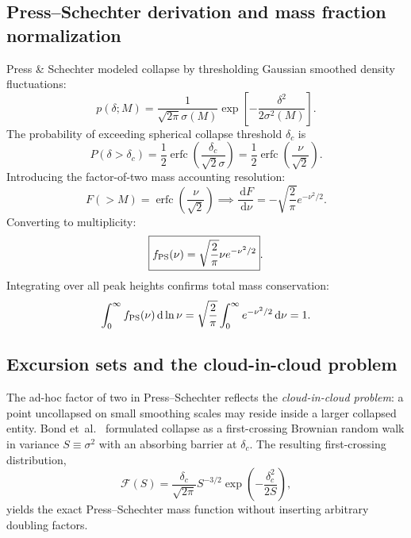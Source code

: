 \documentclass[11pt]{article}
\newcommand{\dd}{\,\mathrm d}
\begin{document}
\subsection{Press--Schechter derivation and mass fraction normalization}
Press \& Schechter \cite{PressSchechter1974} modeled collapse by thresholding Gaussian smoothed density fluctuations:
\begin{equation}
p(\delta; M) = \frac{1}{\sqrt{2\pi}\sigma(M)}\exp\left[ -\frac{\delta^2}{2\sigma^2(M)} \right].
\end{equation}
The probability of exceeding spherical collapse threshold $\delta_c$ is
\begin{equation}
P(\delta > \delta_c) = \frac{1}{2}\operatorname{erfc}\left( \frac{\delta_c}{\sqrt{2}\sigma} \right) = \frac{1}{2}\operatorname{erfc}\left( \frac{\nu}{\sqrt{2}} \right).
\end{equation}
Introducing the factor-of-two mass accounting resolution:
\begin{equation}
F(>M) = \operatorname{erfc}\left( \frac{\nu}{\sqrt{2}} \right) \implies \frac{\dd F}{\dd\nu} = -\sqrt{\frac{2}{\pi}}e^{-\nu^2/2}.
\end{equation}
Converting to multiplicity:
\begin{equation}
\boxed{f_{\rm PS}(\nu) = \sqrt{\frac{2}{\pi}}\nu e^{-\nu^2/2}}.
\label{eq:ps_multiplicity}
\end{equation}
Integrating over all peak heights confirms total mass conservation:
\begin{equation}
\int_0^\infty f_{\rm PS}(\nu)\dd\ln\nu = \sqrt{\frac{2}{\pi}}\int_0^\infty e^{-\nu^2/2}\dd\nu = 1.
\end{equation}

\subsection{Excursion sets and the cloud-in-cloud problem}
The ad-hoc factor of two in Press--Schechter reflects the \emph{cloud-in-cloud problem}: a point uncollapsed on small smoothing scales may reside inside a larger collapsed entity. Bond et~al.~\cite{BondEtAl1991} formulated collapse as a first-crossing Brownian random walk in variance $S \equiv \sigma^2$ with an absorbing barrier at $\delta_c$. The resulting first-crossing distribution,
\begin{equation}
\mathcal F(S) = \frac{\delta_c}{\sqrt{2\pi}}S^{-3/2}\exp\left(-\frac{\delta_c^2}{2S}\right),
\end{equation}
yields the exact Press--Schechter mass function without inserting arbitrary doubling factors.
\end{document}
